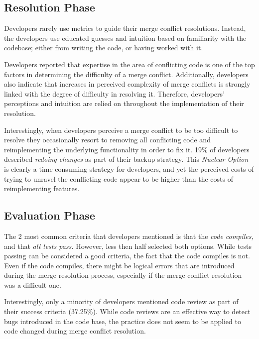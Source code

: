 \subsection{Resolution Phase}

Developers rarely use metrics to guide their merge conflict resolutions.
Instead, the developers use educated guesses and intuition based on familiarity with the codebase; either from writing the code, or having worked with it.

Developers reported that expertise in the area of conflicting code is one of the top factors in determining the difficulty of a merge conflict.
Additionally, developers also indicate that increases in perceived complexity of merge conflicts is strongly linked with the degree of difficulty in resolving it.
Therefore, developers' perceptions and intuition are relied on throughout the implementation of their resolution.

Interestingly, when developers perceive a merge conflict to be too difficult to resolve they occasionally resort to removing all conflicting code and reimplementing the underlying functionality in order to fix it.
19\% of developers described \textit{redoing changes} as part of their backup strategy.
This \textit{Nuclear Option} is clearly a time-consuming strategy for developers, and yet the perceived costs of trying to unravel the conflicting code appear to be higher than the costs of reimplementing features.

\subsection{Evaluation Phase}

The 2 most common criteria that developers mentioned is that the \emph{code compiles,} and that \emph{all tests pass.}
However, less then half selected both options.
While tests passing can be considered a good criteria, the fact that the code compiles is not.
Even if the code compiles, there might be logical errors that are introduced during the merge resolution process, especially if the merge conflict resolution was a difficult one.

Interestingly, only a minority of developers mentioned code review as part of their success criteria (37.25\%).
While code reviews are an effective way to detect bugs introduced in the code base, the practice does not seem to be applied to code changed during merge conflict resolution.

